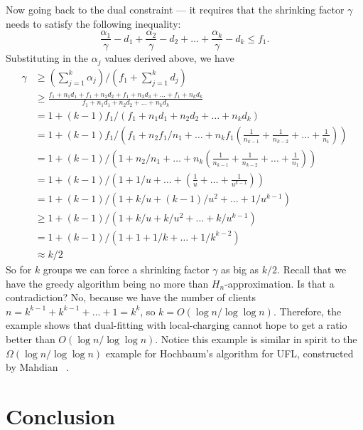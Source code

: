 \documentclass[oneside,final]{ucr}
\begin{document}
Now going back to the dual constraint --- it requires that
the shrinking factor $\gamma$ needs to satisfy the following
inequality:
\begin{equation}
  \frac{\alpha_1}{\gamma} - d_1 + \frac{\alpha_2}{\gamma} - d_2 +
  \ldots + \frac{\alpha_k}{\gamma} - d_k \leq f_1.
\end{equation}
Substituting in the $\alpha_j$ values derived above, we have
\begin{align*}
  \gamma &\geq (\sum_{j=1}^k \alpha_j) / (f_1 + \sum_{j=1}^k d_j)\\
  &\geq \frac{f_1 + n_1 d_1 + f_1 + n_2 d_2 + f_1 + n_3 d_3 + \ldots +
    f_1 + n_k
    d_k}{f_1 + n_1 d_1 + n_2 d_2 + \ldots + n_k d_k}\\
  &= 1 + (k-1)f_1 / (f_1 + n_1 d_1 + n_2 d_2 + \ldots + n_k d_k)\\
  &= 1 + (k-1)f_1 / \left(f_1 + n_2 f_1 / n_1 + \ldots + n_k f_1
    (\frac{1}{n_{k-1}} + \frac{1}{n_{k-2}} + \ldots +
    \frac{1}{n_1})\right)\\
  &= 1 + (k-1) / \left(1 + n_2 / n_1 + \ldots + n_k
    (\frac{1}{n_{k-1}} + \frac{1}{n_{k-2}} + \ldots +
    \frac{1}{n_1})\right)\\
  &= 1 + (k-1) / \left(1 + 1/u + \ldots + (\frac{1}{u} + \ldots +
    \frac{1}{u^{k-1}})\right)\\
  &= 1 + (k-1) / \left(1 + k/u + (k-1)/u^2 + \ldots +
    1/u^{k-1}\right)\\
  &\geq 1 + (k-1) / \left(1 + k/u + k/u^2 + \ldots +
    k/u^{k-1}\right)\\
  &= 1 + (k-1) / \left(1 + 1 + 1/k + \ldots + 1/k^{k-2}\right)\\
  &\approx k/2
\end{align*}
So for $k$ groups we can force a shrinking factor $\gamma$
as big as $k/2$. Recall that we have the greedy algorithm
being no more than $H_n$-approximation. Is that a
contradiction? No, because we have the number of clients
$n=k^{k-1} + k^{k-1} + \ldots + 1 = k^k$, so $k = O(\log n /
\log\log n)$. Therefore, the example shows that dual-fitting
with local-charging cannot hope to get a ratio better than
$O(\log n / \log\log n)$. Notice this example is similar in
spirit to the $\Omega(\log n/ \log\log n)$ example for
Hochbaum's algorithm for UFL, constructed by Mahdian {\etal}
~\cite{JainMMSV03}.

\chapter{Conclusion} \label{ch: conclusion} 
\end{document}
